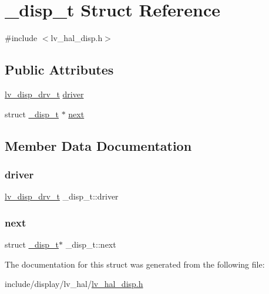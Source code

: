 \hypertarget{struct__disp__t}{}\section{\+\_\+disp\+\_\+t Struct Reference}
\label{struct__disp__t}


{\ttfamily \#include $<$lv\+\_\+hal\+\_\+disp.\+h$>$}

\subsection*{Public Attributes}
\begin{DoxyCompactItemize}
\item 
\mbox{\hyperlink{lv__hal__disp_8h_ae0df046fe59b16094a051e0b8bce40dc}{lv\+\_\+disp\+\_\+drv\+\_\+t}} \mbox{\hyperlink{struct__disp__t_a41b2d7b8aece123e730aba6de4737040}{driver}}
\item 
struct \mbox{\hyperlink{struct__disp__t}{\+\_\+disp\+\_\+t}} $\ast$ \mbox{\hyperlink{struct__disp__t_affd9c2d4529dff85b079189219d97d1c}{next}}
\end{DoxyCompactItemize}


\subsection{Member Data Documentation}
\mbox{\label{struct__disp__t_a41b2d7b8aece123e730aba6de4737040}} 
\subsubsection{\texorpdfstring{driver}{driver}}
{\footnotesize\ttfamily \mbox{\hyperlink{lv__hal__disp_8h_ae0df046fe59b16094a051e0b8bce40dc}{lv\+\_\+disp\+\_\+drv\+\_\+t}} \+\_\+disp\+\_\+t\+::driver}

\mbox{\label{struct__disp__t_affd9c2d4529dff85b079189219d97d1c}} 
\subsubsection{\texorpdfstring{next}{next}}
{\footnotesize\ttfamily struct \mbox{\hyperlink{struct__disp__t}{\+\_\+disp\+\_\+t}}$\ast$ \+\_\+disp\+\_\+t\+::next}



The documentation for this struct was generated from the following file\+:\begin{DoxyCompactItemize}
\item 
include/display/lv\+\_\+hal/\mbox{\hyperlink{lv__hal__disp_8h}{lv\+\_\+hal\+\_\+disp.\+h}}\end{DoxyCompactItemize}
